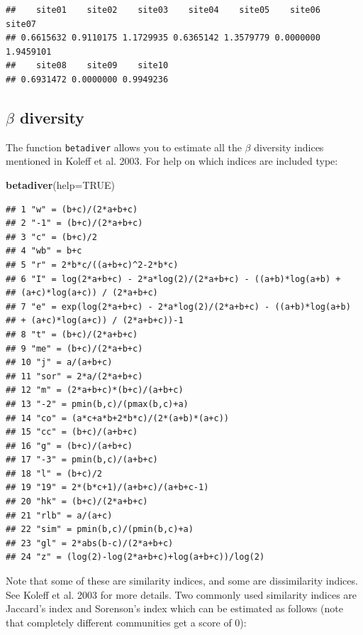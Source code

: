 \documentclass[]{book}
\newenvironment{Shaded}{\begin{snugshade}}{\end{snugshade}}
\newcommand{\KeywordTok}[1]{\textcolor[rgb]{0.13,0.29,0.53}{\textbf{{#1}}}}
\newcommand{\DataTypeTok}[1]{\textcolor[rgb]{0.13,0.29,0.53}{{#1}}}
\newcommand{\OtherTok}[1]{\textcolor[rgb]{0.56,0.35,0.01}{{#1}}}
\newcommand{\NormalTok}[1]{{#1}}
\theoremstyle{definition}
\theoremstyle{definition}
\theoremstyle{definition}
\theoremstyle{remark}
\begin{document}
\begin{verbatim}
##    site01    site02    site03    site04    site05    site06    site07 
## 0.6615632 0.9110175 1.1729935 0.6365142 1.3579779 0.0000000 1.9459101 
##    site08    site09    site10 
## 0.6931472 0.0000000 0.9949236
\end{verbatim}

\subsection{\texorpdfstring{\(\beta\)
diversity}{\textbackslash{}beta diversity}}\label{beta-diversity}

The function \texttt{betadiver} allows you to estimate all the \(\beta\)
diversity indices mentioned in Koleff et al. 2003. For help on which
indices are included type:

\begin{Shaded}
\begin{Highlighting}[]
\KeywordTok{betadiver}\NormalTok{(}\DataTypeTok{help=}\OtherTok{TRUE}\NormalTok{)}
\end{Highlighting}
\end{Shaded}

\begin{verbatim}
## 1 "w" = (b+c)/(2*a+b+c)
## 2 "-1" = (b+c)/(2*a+b+c)
## 3 "c" = (b+c)/2
## 4 "wb" = b+c
## 5 "r" = 2*b*c/((a+b+c)^2-2*b*c)
## 6 "I" = log(2*a+b+c) - 2*a*log(2)/(2*a+b+c) - ((a+b)*log(a+b) +
## (a+c)*log(a+c)) / (2*a+b+c)
## 7 "e" = exp(log(2*a+b+c) - 2*a*log(2)/(2*a+b+c) - ((a+b)*log(a+b)
## + (a+c)*log(a+c)) / (2*a+b+c))-1
## 8 "t" = (b+c)/(2*a+b+c)
## 9 "me" = (b+c)/(2*a+b+c)
## 10 "j" = a/(a+b+c)
## 11 "sor" = 2*a/(2*a+b+c)
## 12 "m" = (2*a+b+c)*(b+c)/(a+b+c)
## 13 "-2" = pmin(b,c)/(pmax(b,c)+a)
## 14 "co" = (a*c+a*b+2*b*c)/(2*(a+b)*(a+c))
## 15 "cc" = (b+c)/(a+b+c)
## 16 "g" = (b+c)/(a+b+c)
## 17 "-3" = pmin(b,c)/(a+b+c)
## 18 "l" = (b+c)/2
## 19 "19" = 2*(b*c+1)/(a+b+c)/(a+b+c-1)
## 20 "hk" = (b+c)/(2*a+b+c)
## 21 "rlb" = a/(a+c)
## 22 "sim" = pmin(b,c)/(pmin(b,c)+a)
## 23 "gl" = 2*abs(b-c)/(2*a+b+c)
## 24 "z" = (log(2)-log(2*a+b+c)+log(a+b+c))/log(2)
\end{verbatim}

Note that some of these are similarity indices, and some are
dissimilarity indices. See Koleff et al. 2003 for more details. Two
commonly used similarity indices are Jaccard's index and Sorenson's
index which can be estimated as follows (note that completely different
communities get a score of 0):
\end{document}
